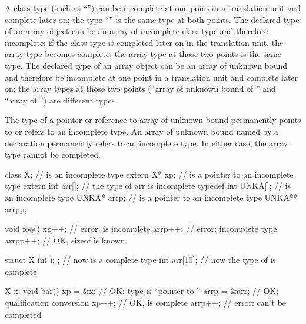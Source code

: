 \pnum
A class type (such as ``'') can be incomplete at one
point in a translation unit and complete later on; the type
``'' is the same type at both points. The declared type
of an array object can be an array of incomplete class type and
therefore incomplete; if the class type is completed later on in the
translation unit, the array type becomes complete; the array type at
those two points is the same type. The declared type of an array object
can be an array of unknown bound and therefore be incomplete at one
point in a translation unit and complete later on; the array types at
those two points (``array of unknown bound of '' and ``array of
 '') are different types.
\begin{note}
The type of a pointer or reference to array of unknown bound
permanently points to or refers to an incomplete type.
An array of unknown bound named by a  declaration
permanently refers to an incomplete type.
In either case, the array type cannot be completed.
\end{note}
\begin{example}
%
\begin{codeblock}
class X;                        //  is an incomplete type
extern X* xp;                   //  is a pointer to an incomplete type
extern int arr[];               // the type of arr is incomplete
typedef int UNKA[];             //  is an incomplete type
UNKA* arrp;                     //  is a pointer to an incomplete type
UNKA** arrpp;

void foo() {
  xp++;                         // error:  is incomplete
  arrp++;                       // error: incomplete type
  arrpp++;                      // OK, sizeof  is known
}

struct X { int i; };            // now  is a complete type
int  arr[10];                   // now the type of  is complete

X x;
void bar() {
  xp = &x;                      // OK; type is ``pointer to ''
  arrp = &arr;                  // OK; qualification conversion
  xp++;                         // OK,  is complete
  arrp++;                       // error:  can't be completed
}
\end{codeblock}
\end{example}

